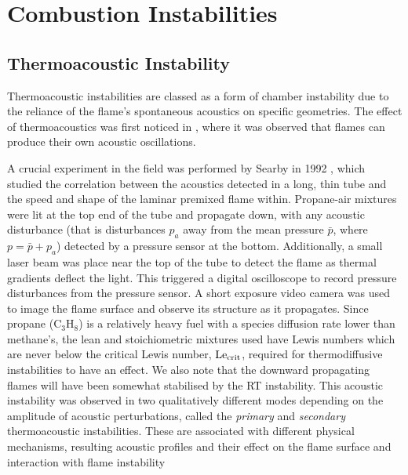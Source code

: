\section{Combustion Instabilities}

\subsection{Thermoacoustic Instability}

Thermoacoustic instabilities are classed as a form of chamber instability due to the reliance of the flame's spontaneous acoustics on specific geometries. The effect of thermoacoustics was first noticed in \cite{mallard1883RecherchesExperimentalesTheoriques}, where it was observed that flames can produce their own acoustic oscillations.


A crucial experiment in the field was performed by Searby in 1992 \cite{searby1992AcousticInstabilityPremixed}, which studied the correlation between the acoustics detected in a long, thin tube and the speed and shape of the laminar premixed flame within. Propane-air mixtures were lit at the top end of the tube and propagate down, with any acoustic disturbance (that is disturbances $p_a$ away from the mean pressure $\bar{p}$, where $p = \bar{p} + p_a$) detected by a pressure sensor at the bottom. Additionally, a small laser beam was place near the top of the tube to detect the flame as thermal gradients deflect the light. This triggered a digital oscilloscope to record pressure disturbances from the pressure sensor. A short exposure video camera was used to image the flame surface and observe its structure as it propagates. Since propane (C$_3$H$_8$) is a relatively heavy fuel with a species diffusion rate lower than methane's, the lean and stoichiometric mixtures used have Lewis numbers which are never below the critical Lewis number, $\mathrm{Le}_\mathrm{crit}$, required for thermodiffusive instabilities to have an effect. We also note that the downward propagating flames will have been somewhat stabilised by the RT instability. This acoustic instability was observed in two qualitatively different modes depending on the amplitude of acoustic perturbations, called the \emph{primary} and \emph{secondary} thermoacoustic instabilities. These are associated with different physical mechanisms, resulting acoustic profiles and their effect on the flame surface and interaction with flame instability

